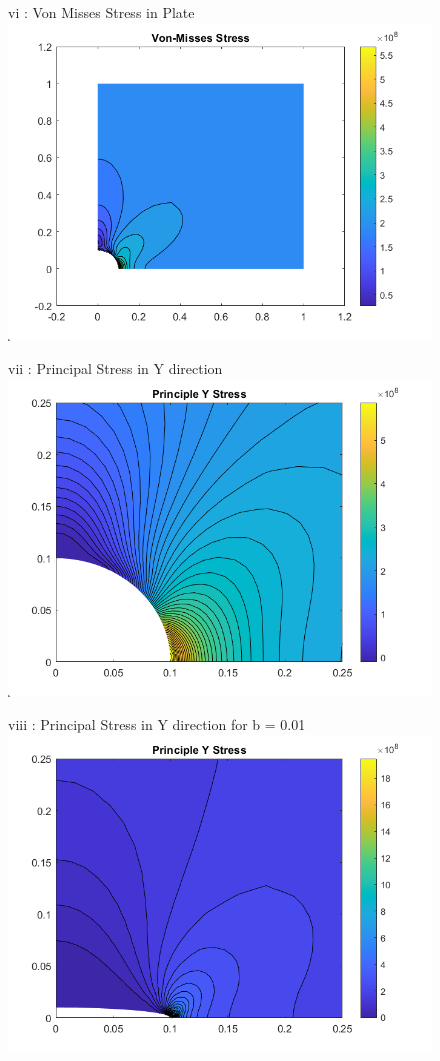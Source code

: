 \documentclass{article}
\begin{document}
\begin{figure}[t]
	vi : Von Misses Stress in Plate
	\includegraphics[width=20cm]{vm_stress}
	\centering
\end{figure}

\begin{figure}[t]
	vii : Principal Stress in Y direction
	\includegraphics[width=20cm]{principal_near}
	\centering
\end{figure}

\begin{figure}[t]
	viii : Principal Stress in Y direction for b = 0.01
	\includegraphics[width=20cm]{principal_near_max}
	\centering
\end{figure}
	
\end{document}
